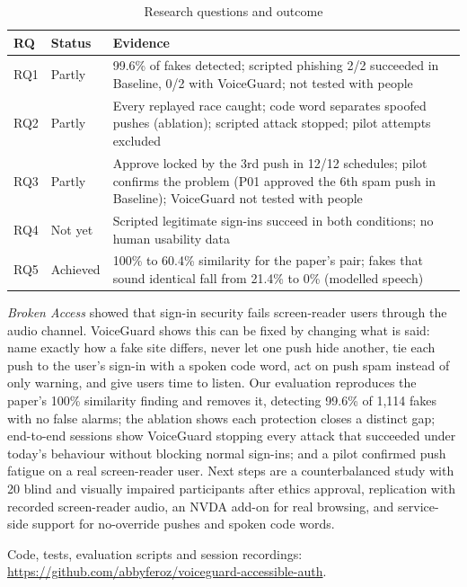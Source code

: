 \documentclass[conference]{IEEEtran}
\begin{document}
\begin{table}[t]
\caption{Research questions and outcome}
\label{tab:achieved}
\footnotesize
\begin{tabularx}{\columnwidth}{@{}p{0.75cm}p{1.15cm}X@{}}
\toprule
RQ & Status & Evidence \\
\midrule
RQ1 & Partly & 99.6\% of fakes detected; scripted phishing 2/2 succeeded in Baseline, 0/2 with VoiceGuard; not tested with people \\
RQ2 & Partly & Every replayed race caught; code word separates spoofed pushes (ablation); scripted attack stopped; pilot attempts excluded \\
RQ3 & Partly & Approve locked by the 3rd push in 12/12 schedules; pilot confirms the problem (P01 approved the 6th spam push in Baseline); VoiceGuard not tested with people \\
RQ4 & Not yet & Scripted legitimate sign-ins succeed in both conditions; no human usability data \\
RQ5 & Achieved & 100\% to 60.4\% similarity for the paper's pair; fakes that sound identical fall from 21.4\% to 0\% (modelled speech) \\
\bottomrule
\end{tabularx}
\end{table}

\emph{Broken Access} showed that sign-in security fails screen-reader users through the audio channel. VoiceGuard shows this can be fixed by changing what is said: name exactly how a fake site differs, never let one push hide another, tie each push to the user's sign-in with a spoken code word, act on push spam instead of only warning, and give users time to listen. Our evaluation reproduces the paper's 100\% similarity finding and removes it, detecting 99.6\% of 1,114 fakes with no false alarms; the ablation shows each protection closes a distinct gap; end-to-end sessions show VoiceGuard stopping every attack that succeeded under today's behaviour without blocking normal sign-ins; and a pilot confirmed push fatigue on a real screen-reader user. Next steps are a counterbalanced study with 20 blind and visually impaired participants after ethics approval, replication with recorded screen-reader audio, an NVDA add-on for real browsing, and service-side support for no-override pushes and spoken code words.

Code, tests, evaluation scripts and session recordings: \url{https://github.com/abbyferoz/voiceguard-accessible-auth}.
\end{document}
